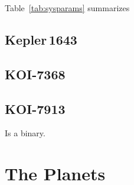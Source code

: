 \documentclass[12pt,twocolumn,linenumbers]{aastex63}
\newcommand{\cn}{Cep-Her complex} %
\begin{document}
Table~\ref{tab:sysparams} summarizes
%
%
%
%
%


\subsection{Kepler\,1643}
\subsection{KOI-7368}
\subsection{KOI-7913}
Is a binary.

\section{The Planets}
\label{sec:planet}
\end{document}
